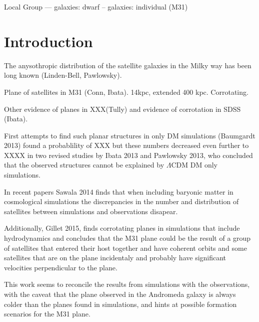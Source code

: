 \documentclass[useAMS,usenatbib]{mn2e}
\begin{document}
\date{Accepted xxx. Received xxxx; in original form xxxx}

\pagerange{\pageref{firstpage}--\pageref{lastpage}} 

\maketitle

\label{firstpage}

\begin{abstract}

\end{abstract}

\begin{keywords}
Local Group --- galaxies: dwarf -- galaxies: individual (M31)  
\end{keywords}

\section{Introduction}

The anysothropic distribution of the satellite galaxies in the Milky
way has been long known (Linden-Bell, Pawlowsky).

Plane of satellites in M31 (Conn, Ibata). 14kpc, extended 400 kpc.
Corrotating.
   
Other evidence of planes in XXX(Tully) and evidence of corrotation in
SDSS (Ibata).

First attempts to find such planar structures in only DM simulations
(Baumgardt 2013) found a probablility of XXX but these numbers
decreased even further to XXXX in two revised studies by Ibata 2013
and Pawlowsky 2013, who concluded that the observed structures cannot
be explained by $\Lambda$CDM DM only simulations.

In recent papers Sawala 2014 finds that when including baryonic matter in
cosmological simulations the discrepancies in the number and
distribution of satellites between simulations and
observations disapear.
 
Additionally, Gillet 2015, finds corrotating
planes in simulations that include hydrodynamics and concludes that the M31
plane could be the result of a group of satellites that entered their
host together and have coherent orbits and some satellites that are on
the plane incidentaly and probably have significant velocities
perpendicular to the plane. 

This work seems to reconcile the results
from simulations with the observations, with the caveat that the plane observed in the 
Andromeda galaxy is always colder than the planes found in simulations, 
and hints at possible formation scenarios for the M31 plane.  
\end{document}
